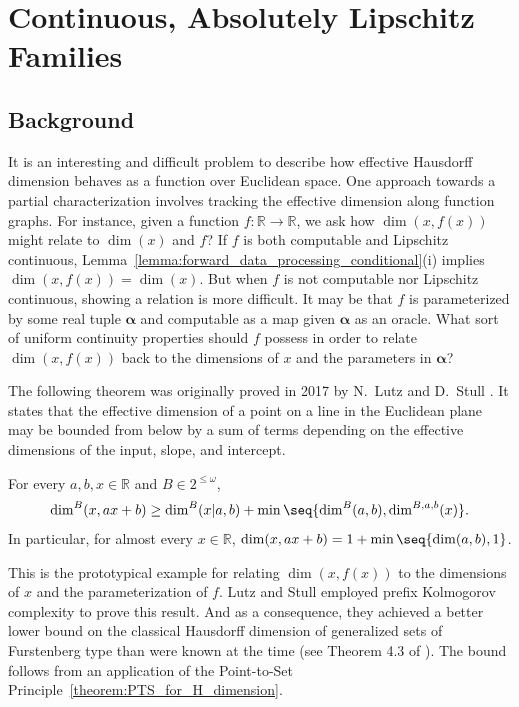 \chapter{Continuous, Absolutely Lipschitz Families}\label{chapter:CALFs}

\section{Background}

It is an interesting and difficult problem to describe how effective Hausdorff dimension behaves as a function over Euclidean space. One approach towards a partial characterization involves tracking the effective dimension along function graphs. For instance, given a function $f : \mathbb{R} \to \mathbb{R}$, we ask how $\dim(x, f(x))$ might relate to $\dim(x)$ and $f$? If $f$ is both computable and Lipschitz continuous, Lemma~\ref{lemma:forward_data_processing_conditional}(i) implies $\dim(x, f(x)) = \dim(x)$. But when $f$ is not computable nor Lipschitz continuous, showing a relation is more difficult. It may be that $f$ is parameterized by some real tuple $\boldsymbol{\alpha}$ and computable as a map given $\boldsymbol{\alpha}$ as an oracle. What sort of uniform continuity properties should $f$ possess in order to relate $\dim(x, f(x))$ back to the dimensions of $x$ and the parameters in $\boldsymbol{\alpha}$?

The following theorem was originally proved in 2017 by N.~Lutz and D.~Stull \cite{LS16}. It states that the effective dimension of a point on a line in the Euclidean plane may be bounded from below by a sum of terms depending on the effective dimensions of the input, slope, and intercept.

\begin{theorem} \label{theorem:original_infinitary}
    For every $a, b, x \in \mathbb{R}$ and $B \in 2^{\leq \omega}$,
    \begin{align}
        \label{equation:original_lower_bound_result}
        \dim^B(x, ax + b) \geq \dim^B(x | a, b) + \min \seq{\dim^B(a, b), \dim^{B, a, b}(x)}.
    \end{align}
    In particular, for almost every $x \in \mathbb{R}$, $\dim(x, ax + b) = 1 + \min \seq{\dim(a, b), 1}$.
\end{theorem}

This is the prototypical example for relating $\dim(x, f(x))$ to the dimensions of $x$ and the parameterization of $f$. Lutz and Stull employed prefix Kolmogorov complexity to prove this result. And as a consequence, they achieved a better lower bound on the classical Hausdorff dimension of generalized sets of Furstenberg type than were known at the time (see Theorem 4.3 of \cite{LS16}). The bound follows from an application of the Point-to-Set Principle~\ref{theorem:PTS_for_H_dimension}. 

